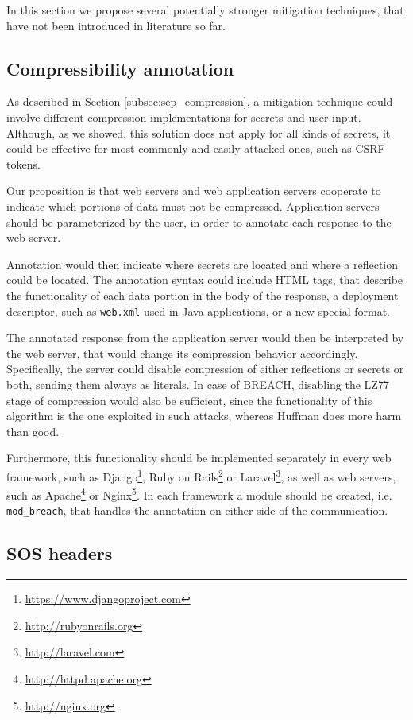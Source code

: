 In this section we propose several potentially stronger mitigation techniques,
that have not been introduced in literature so far.

\subsection{Compressibility annotation}

As described in Section \ref{subsec:sep_compression}, a mitigation technique
could involve different compression implementations for secrets and user input.
Although, as we showed, this solution does not apply for all kinds of secrets,
it could be effective for most commonly and easily attacked ones, such as CSRF
tokens.

Our proposition is that web servers and web application servers cooperate to
indicate which portions of data must not be compressed. Application servers
should be parameterized by the user, in order to annotate each response to the
web server.

Annotation would then indicate where secrets are located and where a reflection
could be located. The annotation syntax could include HTML tags, that describe
the functionality of each data portion in the body of the response, a deployment
descriptor, such as \texttt{web.xml} used in Java applications, or a new special
format.

The annotated response from the application server would then be interpreted by
the web server, that would change its compression behavior accordingly.
Specifically, the server could disable compression of either reflections or
secrets or both, sending them always as literals. In case of BREACH, disabling
the LZ77 stage of compression would also be sufficient, since the functionality
of this algorithm is the one exploited in such attacks, whereas Huffman does
more harm than good.

Furthermore, this functionality should be implemented separately in every web
framework, such as Django\footnote{\url{https://www.djangoproject.com}}, Ruby on
Rails\footnote{\url{http://rubyonrails.org}} or
Laravel\footnote{\url{http://laravel.com}}, as well as web servers, such as
Apache\footnote{\url{http://httpd.apache.org}} or
Nginx\footnote{\url{http://nginx.org}}. In each framework a module should be
created, i.e. \texttt{mod\_breach}, that handles the annotation on either side
of the communication.

\subsection{SOS headers}


